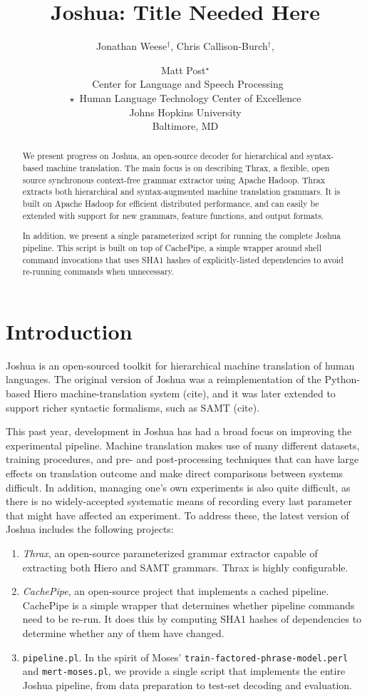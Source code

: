 \documentclass[11pt]{article}
\title{Joshua: Title Needed Here}
\author{Jonathan Weese${}^\dag$, Chris Callison-Burch${}^\dag$, \and Matt Post${}^\star$ \\
\textdagger\ Center for Language and Speech Processing \\
$\star$\ Human Language Technology Center of Excellence \\
Johns Hopkins University \\
Baltimore, MD}
\date{}
\begin{document}
\maketitle

\begin{abstract}
We present progress on Joshua, an open-source decoder for hierarchical
and syntax-based machine translation.  The main focus
is on describing Thrax, a flexible, open source synchronous
context-free grammar extractor using Apache Hadoop.  Thrax extracts
both hierarchical \cite{Chiang2007} and syntax-augmented machine
translation \cite{samt2006} grammars.  It is built on Apache Hadoop for efficient
distributed performance, and can easily be extended with
support for new grammars, feature functions, and output formats.  

In addition, we present a single parameterized script for running the
complete Joshua pipeline.  This script is built on top of CachePipe, a
simple wrapper around shell command invocations that uses SHA1 hashes
of explicitly-listed dependencies to avoid re-running commands when
unnecessary.
\end{abstract}

\section{Introduction}

Joshua is an open-sourced toolkit for hierarchical machine translation
of human languages.  The original version of Joshua was a
reimplementation of the Python-based Hiero machine-translation system
(cite), and it was later extended to support richer syntactic
formalisms, such as SAMT (cite).

This past year, development in Joshua has had a broad focus on
improving the experimental pipeline.  Machine translation makes
use of many different datasets, training procedures, and pre- and
post-processing techniques that can have large effects on translation
outcome and make direct comparisons between systems difficult.  In addition,
managing one's own experiments is also quite difficult, as there is no
widely-accepted systematic means of recording every last parameter
that might have affected an experiment.  To address these, the latest
version of Joshua includes the following projects:

\begin{enumerate}
\item \emph{Thrax}, an open-source parameterized grammar extractor
  capable of extracting both Hiero and SAMT grammars.  Thrax is highly
  configurable.
\item \emph{CachePipe}, an open-source project that implements a cached
  pipeline.  CachePipe is a simple wrapper that determines whether
  pipeline commands need to be re-run.  It does this by computing SHA1
  hashes of dependencies to determine whether any of them have changed.
\item \verb|pipeline.pl|.  In the spirit of Moses'
  \verb|train-factored-phrase-model.perl| and \verb|mert-moses.pl|, we
  provide a single script that implements the entire Joshua pipeline,
  from data preparation to test-set decoding and evaluation.
\end{enumerate}
\end{document}
